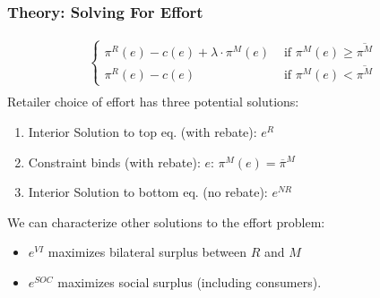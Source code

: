 \documentclass[aspectratio=169,11pt]{beamer}
\begin{document}
\begin{frame}
\frametitle{Theory: Solving For Effort}
\begin{eqnarray*}
\label{effortchoice}
\begin{cases}
 \pi^R(e) -c(e) + \lambda \cdot \pi^M(e) &\mbox{ if } \pi^M(e) \geq \overline{\pi^M}\\
 \pi^R(e)  -c(e)   &\mbox{ if } \pi^M(e) < \overline{\pi^M}
\end{cases}\\
\end{eqnarray*}
Retailer choice of effort has three potential solutions:
\begin{enumerate}
\item Interior Solution to top eq. (with rebate): $e^{R}$
\item Constraint binds (with rebate):  $e$: $\pi^M(e) = \overline{\pi}^M$
\item Interior Solution to bottom eq. (no rebate): $e^{NR}$
\end{enumerate}
We can characterize other solutions to the effort problem:
\begin{itemize}
\item $e^{VI}$ maximizes bilateral surplus between $R$ and $M$
\item $e^{SOC}$ maximizes social surplus (including consumers).
\end{itemize}
\end{frame}

\end{document}

